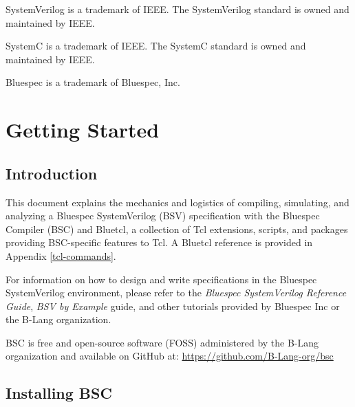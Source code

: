 \documentclass{article}
\begin{document}
SystemVerilog is a trademark of IEEE.  The SystemVerilog standard is
owned and maintained by IEEE.

SystemC is a trademark of IEEE.  The SystemC standard is owned and
maintained by IEEE.

Bluespec is a trademark of Bluespec, Inc.


\newpage

\clearpage
{}
{}

\tableofcontents

\newpage


\section{Getting Started}


\subsection{Introduction}

\label{sec-intro}

This document explains the mechanics and logistics of compiling,
simulating, and analyzing a Bluespec SystemVerilog (BSV)
specification with the Bluespec Compiler (BSC)
and Bluetcl, a collection of Tcl extensions, scripts, and packages
providing BSC-specific features to Tcl.
A Bluetcl reference is provided in Appendix \ref{tcl-commands}.

For information on how to design and write specifications in the
Bluespec SystemVerilog environment, please refer to the
{\em Bluespec SystemVerilog Reference Guide}, {\em BSV by Example} guide,
and other tutorials provided by Bluespec Inc or the B-Lang organization.

BSC is free and open-source software (FOSS) administered by the B-Lang
organization and available on GitHub at:
\url{https://github.com/B-Lang-org/bsc}


\subsection{Installing BSC}
\label{sec-installation}
\end{document}
